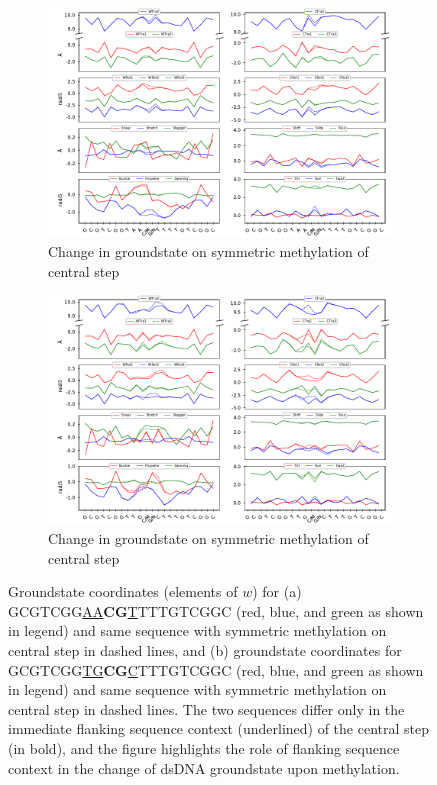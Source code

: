 \begin{figure}
  \begin{subfigure}{15cm}
    \centering\includegraphics[width=15cm]{images/compare_epi_sensitivity_on_groundstate_MN_1.pdf}
    \centering\caption{Change in groundstate on symmetric methylation of central \cpg step}
  \end{subfigure} 
  
  \begin{subfigure}{15cm}
    \centering\includegraphics[width=15cm]{images/compare_epi_sensitivity_on_groundstate_MN_2.pdf}
    \centering\caption{Change in groundstate on symmetric methylation of central \cpg step}
  \end{subfigure}
\caption{Groundstate coordinates (elements of $w$) for (a) GCGTCGG\underline{AA}\textbf{CG}\underline{T}TTTGTCGGC (red, blue, and green as shown in legend) and same sequence with symmetric methylation on central \cpg step in dashed lines, and (b) groundstate coordinates for GCGTCGG\underline{TG}\textbf{CG}\underline{C}TTTGTCGGC (red, blue, and green as shown in legend) and same sequence with symmetric methylation on central \cpg step in dashed lines. 
The two sequences differ only in the immediate flanking sequence context (underlined) of the central \cpg step (in bold), and the figure highlights the role of flanking sequence context in the change of dsDNA groundstate upon \cpg methylation.}
\label{c6:fig6_sensitivity}
\end{figure}



